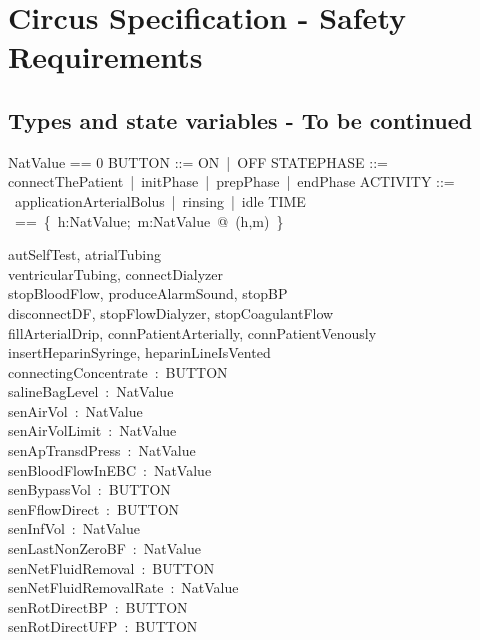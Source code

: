 \section{Circus Specification - Safety Requirements}
\subsection{Types and state variables - To be continued}

\begin{zed}
NatValue == 0 
\also BUTTON ::= ON~|~OFF
\also STATEPHASE ::= connectThePatient~|~initPhase~|~prepPhase~|~endPhase
\also ACTIVITY ::= ~applicationArterialBolus~|~rinsing~|~idle
\also TIME ~==~\{~h:NatValue;~m:NatValue~@~(h,m)~\}
\end{zed}

\begin{circus}
  \circchannel autSelfTest, atrialTubing\\
  \circchannel ventricularTubing, connectDialyzer\\
  \circchannel stopBloodFlow, produceAlarmSound, stopBP\\
  \circchannel disconnectDF, stopFlowDialyzer, stopCoagulantFlow\\
  \circchannel fillArterialDrip, connPatientArterially, connPatientVenously\\
  \circchannel insertHeparinSyringe, heparinLineIsVented\\
  \circchannel connectingConcentrate~:~BUTTON\\
  \circchannel salineBagLevel~:~NatValue\\
  \circchannel senAirVol~:~NatValue\\
  \circchannel senAirVolLimit~:~NatValue\\
  \circchannel senApTransdPress~:~NatValue\\
  \circchannel senBloodFlowInEBC~:~NatValue\\
  \circchannel senBypassVol~:~BUTTON\\
  \circchannel senFflowDirect~:~BUTTON\\
  \circchannel senInfVol~:~NatValue\\
  \circchannel senLastNonZeroBF~:~NatValue\\
  \circchannel senNetFluidRemoval~:~BUTTON\\
  \circchannel senNetFluidRemovalRate~:~NatValue\\
  \circchannel senRotDirectBP~:~BUTTON~\\
  \circchannel senRotDirectUFP~:~BUTTON~\\

\end{circus}
